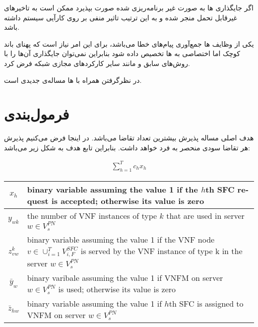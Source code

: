 اگر جایگذاری ها به صورت غیر برنامه‌ریزی شده صورت بپذیرد
ممکن است به تاخیرهای غیرقابل تحمل منجر شده و به این ترتیب تاثیر منفی بر روی کارآیی سیستم
داشته باشد.

یکی از وظایف ها جمع‌آوری پیام‌های خطا می‌باشد،
برای این امر نیاز است که پهنای باند کوچک اما اختصاصی به ها
تخصیص داده شود بنابراین نمی‌توان جایگذاری آن‌ها را با روش‌های سابق و مانند سایر
کارکردهای مجازی شبکه فرض کرد.

در نظرگرفتن  همراه با ها مساله‌ی جدیدی است.

\section{فرمول‌بندی}

هدف اصلی مساله پذیرش بیشترین تعداد تقاضا می‌باشد. در اینجا فرض می‌کنیم پذیرش هر تقاضا سودی منحصر به فرد خواهد داشت.
بنابراین تابع هدف به شکل زیر می‌باشد:

\begin{latin}\begin{align}
    \sum_{h=1}^{T} c_hx_h
\end{align}\end{latin}



\begin{center}\begin{latin}\begin{tabular}{|c|p{10cm}|}
    \hline
    $x_h$ & binary variable assuming the value 1 if the $h$th SFC request is accepted; otherwise its value is zero \\
    \hline
    $y_{wk}$ & the number of VNF instances of type $k$ that are used in server $w \in V_s^{PN}$ \\
    \hline
    $z^k_{vw}$ & binary variable assuming the value 1 if the VNF node $v \in \cup_{i=1}^{T} V_{i, F}^{SFC}$ is served by the VNF instance of type k in the server $w \in V_s^{PN}$ \\
    \hline
    $\bar{y}_w$ & binary varibale assuming the value 1 if VNFM on server $w \in V_s^{PN}$ is used; otherwise its value is zero\\
    \hline
    $\bar{z}_{hw}$ & binary variable assuming the value 1 if $h$th SFC is assigned to VNFM on server $w \in V_s^{PN}$\\
    \hline
\end{tabular}\end{latin}\end{center}


